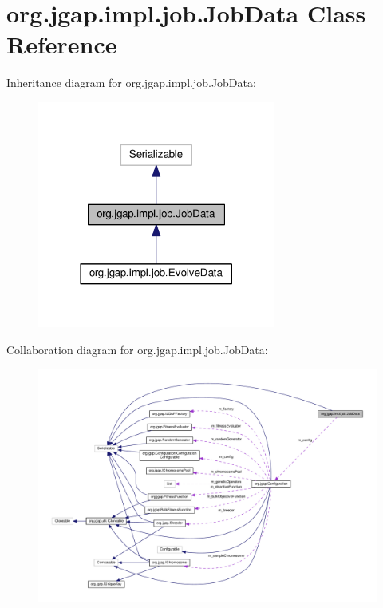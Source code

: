 \hypertarget{classorg_1_1jgap_1_1impl_1_1job_1_1_job_data}{\section{org.\-jgap.\-impl.\-job.\-Job\-Data Class Reference}
\label{classorg_1_1jgap_1_1impl_1_1job_1_1_job_data}
}


Inheritance diagram for org.\-jgap.\-impl.\-job.\-Job\-Data\-:
\nopagebreak
\begin{figure}[H]
\begin{center}
\leavevmode
\includegraphics[width=222pt]{classorg_1_1jgap_1_1impl_1_1job_1_1_job_data__inherit__graph}
\end{center}
\end{figure}


Collaboration diagram for org.\-jgap.\-impl.\-job.\-Job\-Data\-:
\nopagebreak
\begin{figure}[H]
\begin{center}
\leavevmode
\includegraphics[width=350pt]{classorg_1_1jgap_1_1impl_1_1job_1_1_job_data__coll__graph}
\end{center}
\end{figure}
